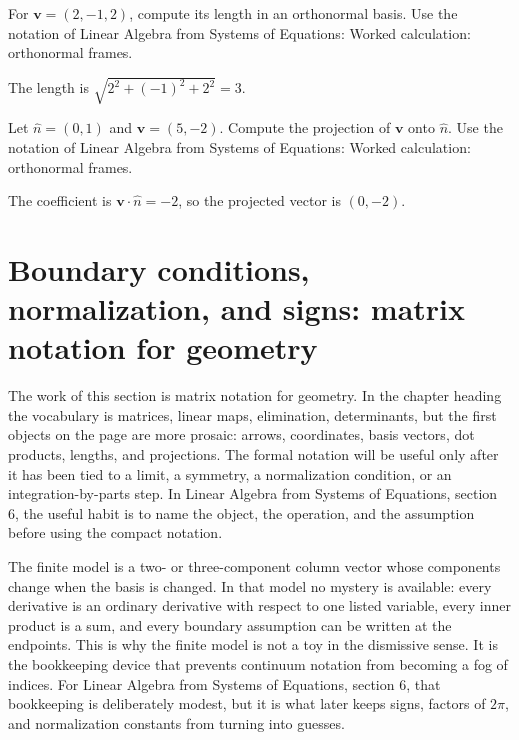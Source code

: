 \begin{exercise}
For \(\bm v=(2,-1,2)\), compute its length in an orthonormal basis.  Use the notation of Linear Algebra from Systems of Equations: Worked calculation: orthonormal frames.
\begin{answer}
The length is \(\sqrt{2^2+(-1)^2+2^2}=3\).
\end{answer}
\end{exercise}

\begin{exercise}
Let \(\hat n=(0,1)\) and \(\bm v=(5,-2)\).  Compute the projection of \(\bm v\) onto \(\hat n\).  Use the notation of Linear Algebra from Systems of Equations: Worked calculation: orthonormal frames.
\begin{answer}
The coefficient is \(\bm v\cdot\hat n=-2\), so the projected vector is \((0,-2)\).
\end{answer}
\end{exercise}



\section{Boundary conditions, normalization, and signs: matrix notation for geometry}

The work of this section is matrix notation for geometry.  In the chapter heading the vocabulary is matrices, linear maps, elimination, determinants, but the first objects on the page are more prosaic: arrows, coordinates, basis vectors, dot products, lengths, and projections.  The formal notation will be useful only after it has been tied to a limit, a symmetry, a normalization condition, or an integration-by-parts step.  In Linear Algebra from Systems of Equations, section 6, the useful habit is to name the object, the operation, and the assumption before using the compact notation.

The finite model is a two- or three-component column vector whose components change when the basis is changed.  In that model no mystery is available: every derivative is an ordinary derivative with respect to one listed variable, every inner product is a sum, and every boundary assumption can be written at the endpoints.  This is why the finite model is not a toy in the dismissive sense.  It is the bookkeeping device that prevents continuum notation from becoming a fog of indices.  For Linear Algebra from Systems of Equations, section 6, that bookkeeping is deliberately modest, but it is what later keeps signs, factors of \(2\pi\), and normalization constants from turning into guesses.

